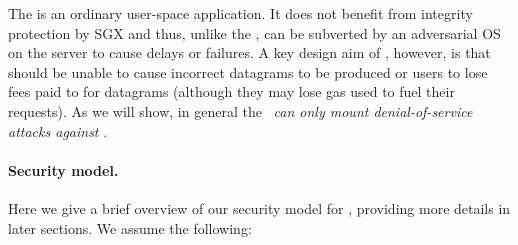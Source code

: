 The \medname is an ordinary user-space application. It does not benefit from integrity protection by SGX and thus, unlike the \encname, can be subverted by an adversarial OS on the \tc server to cause delays or failures. A key design aim of \tc, however, is that \medname should be unable to cause incorrect datagrams to be produced or users to lose fees paid to \tc for datagrams (although they may lose gas used to fuel their requests). As we will show, in general the \medname~{\em can only mount denial-of-service attacks against \tc}. 

\paragraph{Security model.}
Here we give a brief overview of our security model for \tc, providing more details in later sections. We assume the following:

